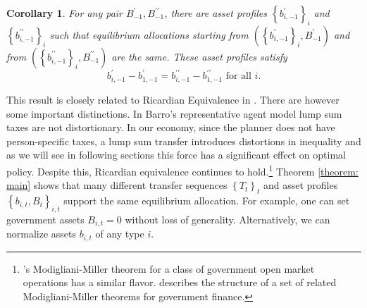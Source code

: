 \documentclass[thmsb,11pt]{article}
\newtheorem{corollary}{Corollary}
\begin{document}
\begin{corollary}
\label{corr: B does not matter} For any pair $B_{-1}^{\prime },B_{-1}^{\prime
\prime }$, there are asset profiles $\left\{ b_{i,-1}^{\prime }\right\} _{i}$ and $%
\left\{ b_{i,-1}^{\prime \prime }\right\} _{i}$ such that
equilibrium allocations starting from  $\left( \left\{ b_{i,-1}^{\prime }\right\}
_{i},B_{-1}^{\prime }\right) $ and  from  $\left( \left\{ b_{i,-1}^{\prime
\prime }\right\} _{i},B_{-1}^{\prime \prime }\right) $ are the same.
These asset profiles satisfy%
\begin{equation*}
b_{i,-1}^{\prime }-b_{1,-1}^{\prime }=b_{i,-1}^{\prime \prime
}-b_{1,-1}^{\prime \prime }\text{ for all }i.
\end{equation*}
\end{corollary}
%


%

\smallskip
This result is closely related to Ricardian Equivalence in \citet{Barro1974}. There are however some important distinctions. In Barro's representative agent model lump sum taxes are not distortionary. In our economy, since the planner does not have person-specific taxes, a lump sum transfer introduces distortions in inequality and as we will see in following sections this force has a significant effect on optimal policy. Despite this, Ricardian equivalence continues to hold.\footnote{%
\citet{Wallace1981}'s Modigliani-Miller theorem for a class of government open
market operations has a similar flavor. \citet{sargent1987dynamic} describes the
structure of a set of related Modigliani-Miller theorems for government
finance.} %
Theorem \ref{theorem: main} shows that many different transfer
sequences $\left\{ T_{t}\right\} _{t}$ and asset profiles $\left\{
b_{i,t},B_{t}\right\} _{i,t}$  support the same  equilibrium allocation.
For example, one can set government assets $B_{i,t}=0$ without loss of
generality.
Alternatively,  we can normalize  assets $b_{i,t}$ of any type $i$.
\end{document}
